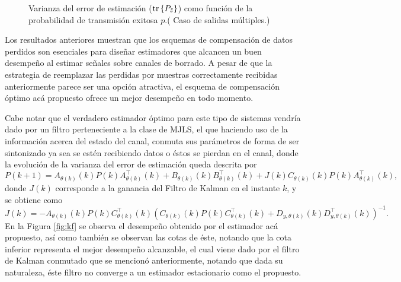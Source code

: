 \begin{figure}[htbp]
\centering
{}
\caption{Varianza del error de estimaci\'on ($\operatorname{tr}\left\{ P_{\tilde{z}} \right\}$) como funci\'on de la probabilidad de transmisi\'on exitosa $p$.( Caso de salidas m\'ultiples.)}\label{fig:example-mimo}
\end{figure}

Los resultados anteriores muestran que los esquemas de compensaci\'on de datos perdidos son esenciales para dise\~nar estimadores que alcancen un buen desempe\~no al estimar se\~nales sobre canales de borrado. A pesar de que la estrategia de reemplazar las perdidas por muestras correctamente recibidas anteriormente parece ser una opci\'on atractiva, el esquema de compensaci\'on \'optimo ac\'a propuesto ofrece un mejor desempe\~no en todo momento.

Cabe notar que el verdadero estimador \'optimo para este tipo de sistemas vendr\'ia dado por un filtro perteneciente a la clase de MJLS, el que haciendo uso de la informaci\'on acerca del estado del canal, conmuta sus par\'ametros de forma de ser sintonizado ya sea se est\'en recibiendo datos o \'estos se pierdan en el canal, donde la evoluci\'on de la varianza del error de estimaci\'on queda descrita por
\begin{equation}
P(k+1)=A_{\theta(k)}(k)P(k)A_{\theta(k)}^{\intercal}(k)+B_{\theta(k)}(k)B_{\theta(k)}^{\intercal}(k)+J(k)C_{\theta(k)}(k)P(k)A_{\theta(k)}^{\intercal}(k),
\end{equation}
donde $J(k)$ corresponde a la ganancia del Filtro de Kalman en el instante $k$, y se obtiene como
\begin{equation}
J(k)=-A_{\theta(k)}(k)P(k)C_{\theta(k)}^{\intercal}(k)\left( C_{\theta(k)}(k)P(k)C_{\theta(k)}^{\intercal}(k)+D_{y,\theta(k)}(k)D_{y,\theta(k)}^{\intercal}(k)\right)^{-1}.
\end{equation}
En la Figura \ref{fig:kf} se observa el desempeño obtenido por el estimador ac\'a propuesto, as\'i como tambi\'en se observan las cotas de \'este, notando que la cota inferior representa el mejor desempeño alcanzable, el cual viene dado por el filtro de Kalman conmutado que se mencion\'o anteriormente, notando que dada su naturaleza, \'este filtro no converge a un estimador estacionario como el propuesto.

